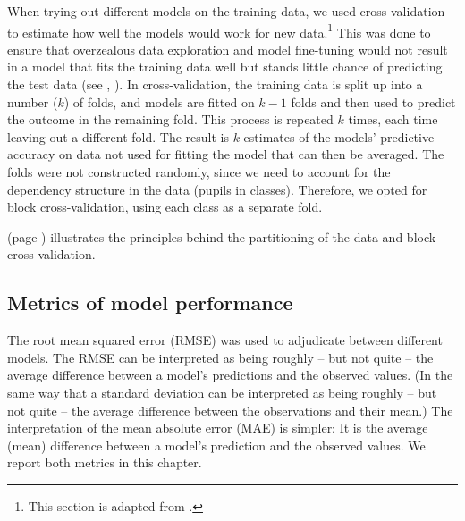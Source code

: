 \documentclass[output=paper]{langsci/langscibook}
\begin{document}
When trying out different models on the training data, we used cross-validation to estimate how well the models would work for new data.\footnote{This section is adapted from \citet{VanhoveEtAl2019}.} This was done to ensure that overzealous data exploration and model fine-tuning would not result in a model that fits the training data well but stands little chance of predicting the test data (see \citealt{KuhnJohnson2013}, \citealt{YarkoniWestfall2017}). In cross-validation, the training data is split up into a number ($k$) of folds, and models are fitted on $k-1$ folds and then used to predict the outcome in the remaining fold. This process is repeated $k$ times, each time leaving out a different fold. The result is $k$ estimates of the models’ predictive accuracy on data not used for fitting the model that can then be averaged. The folds were not constructed randomly, since we need to account for the dependency structure in the data (pupils in classes). Therefore, we opted for block cross-validation, using each class as a separate fold.

 (page \pageref{fig:04:1}) illustrates the principles behind the partitioning of the data and block cross-validation.

\subsection{Metrics of model performance}

The root mean squared error (RMSE) was used to adjudicate between different models. The RMSE can be interpreted as being roughly – but not quite – the average difference between a model’s predictions and the observed values. (In the same way that a standard deviation can be interpreted as being roughly – but not quite – the average difference between the observations and their mean.) The interpretation of the mean absolute error (MAE) is simpler: It is the average (mean) difference between a model’s prediction and the observed values. We report both metrics in this chapter.
\end{document}
